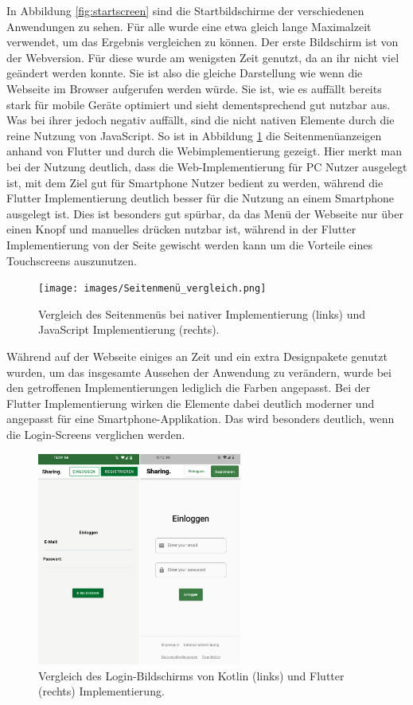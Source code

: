 In Abbildung \ref{fig:startscreen} sind die Startbildschirme der verschiedenen Anwendungen zu sehen. Für alle wurde eine etwa gleich lange Maximalzeit verwendet, um das Ergebnis vergleichen zu können. Der erste Bildschirm ist von der Webversion. Für diese wurde am wenigsten Zeit genutzt, da an ihr nicht viel geändert werden konnte. Sie ist also die gleiche Darstellung wie wenn die Webseite im Browser aufgerufen werden würde.  Sie ist, wie es auffällt bereits stark für mobile Geräte optimiert und sieht dementsprechend gut nutzbar aus. Was bei ihrer jedoch negativ auffällt, sind die nicht nativen Elemente durch die reine Nutzung von JavaScript.
So ist in Abbildung \ref{fig:sidemenu} die Seitenmenüanzeigen anhand von Flutter und durch die Webimplementierung gezeigt. Hier merkt man bei der Nutzung deutlich, dass die Web-Implementierung für PC Nutzer ausgelegt ist, mit dem Ziel gut für Smartphone Nutzer bedient zu werden, während die Flutter Implementierung deutlich besser für die Nutzung an einem Smartphone ausgelegt ist. Dies ist besonders gut spürbar, da das Menü der Webseite nur über einen Knopf und manuelles drücken nutzbar ist, während in der Flutter Implementierung von der Seite gewischt werden kann um die Vorteile eines Touchscreens auszunutzen.

\begin{figure}[ht]
  \centering
  \texttt{[image: images/Seitenmenü\_vergleich.png]} 
  \caption[Vergleich des Seitenmenüs bei nativer Implementierung und JavaScript Implementierung]{Vergleich des Seitenmenüs bei nativer Implementierung (links) und JavaScript Implementierung (rechts).}
  \label{fig:sidemenu}
\end{figure}

Während auf der Webseite einiges an Zeit und ein extra Designpakete genutzt wurden, um das insgesamte Aussehen der Anwendung zu verändern, wurde bei den getroffenen Implementierungen lediglich die Farben angepasst. Bei der Flutter Implementierung wirken die Elemente dabei deutlich moderner und angepasst für eine Smartphone-Applikation. Das wird besonders deutlich, wenn die Login-Screens verglichen werden.

\begin{figure}[ht]
  \centering
  \includegraphics[height=7cm,keepaspectratio]{images/Login_vergleich.png} 
  \caption[Vergleich des Login-Bildschirms von Kotlin und Flutter Implementierung.]{Vergleich des Login-Bildschirms von Kotlin (links) und Flutter (rechts) Implementierung.}
  \label{fig:loginscreen}
\end{figure}

